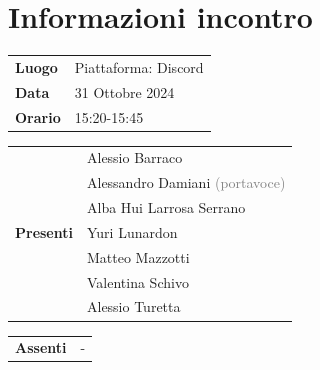 \section{Informazioni incontro}
\vspace{0.25cm}
\begin{tabular}{p{1.75cm} | l}
    \textbf{Luogo} & Piattaforma: Discord\\
    \textbf{Data} & 31 Ottobre 2024\\
    \textbf{Orario} & 15:20-15:45\\
\end{tabular}

\vspace{0.5cm}
\noindent
\begin{tabular}{p{1.75cm} | l}
    \multirow{7}{*}{\textbf{Presenti}}
        & Alessio Barraco\\
        & Alessandro Damiani \textcolor{gray}{(portavoce)}\\ %
        & Alba Hui Larrosa Serrano\\
        & Yuri Lunardon\\
        & Matteo Mazzotti\\
        & Valentina Schivo\\
        & Alessio Turetta
\end{tabular}

\vspace{0.5cm}
\noindent
\begin{tabular}{p{1.75cm} | l}
    \multirow{1}{*}{\textbf{Assenti}}
        & -\\
\end{tabular}

\vspace{0.5cm}
\noindent
\begin{tabular}{p{1.75cm} | l}
\end{tabular}